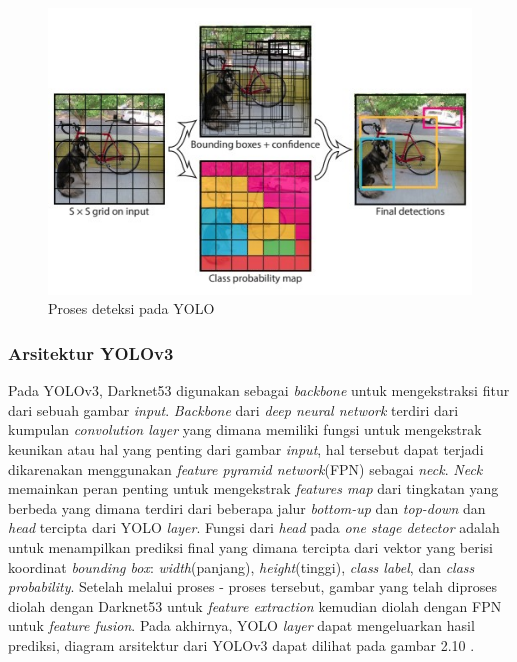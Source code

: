 \begin{figure}[ht]
  \centering
  \includegraphics[scale=0.7]{gambar/proses-deteksi-yolo.jpg}
  \caption{Proses deteksi pada YOLO}
  \label{fig:deteksiyolo}
\end{figure}

\subsubsection{Arsitektur YOLOv3}
\label{subsec:arsitektur-yolov3}
Pada YOLOv3, Darknet53 digunakan sebagai \emph{backbone} untuk mengekstraksi fitur dari sebuah gambar \emph{input}. \emph{Backbone} dari \emph{deep neural network} terdiri dari
kumpulan \emph{convolution layer} yang dimana memiliki fungsi untuk mengekstrak keunikan atau hal yang penting dari gambar \emph{input}, hal tersebut dapat terjadi dikarenakan
menggunakan \emph{feature pyramid network}(FPN) sebagai \emph{neck}. \emph{Neck} memainkan peran penting untuk mengekstrak \emph{features map} dari tingkatan yang berbeda yang dimana
terdiri dari beberapa jalur \emph{bottom-up} dan \emph{top-down} dan \emph{head} tercipta dari YOLO \emph{layer}. Fungsi dari \emph{head} pada \emph{one stage detector} adalah untuk menampilkan
prediksi final yang dimana tercipta dari vektor yang berisi koordinat \emph{bounding box}: \emph{width}(panjang), \emph{height}(tinggi), \emph{class label}, dan \emph{class probability}. Setelah melalui proses - proses tersebut,
gambar yang telah diproses diolah dengan Darknet53 untuk \emph{feature extraction} kemudian diolah dengan FPN untuk \emph{feature fusion}. Pada akhirnya, YOLO \emph{layer} dapat mengeluarkan
hasil prediksi, diagram arsitektur dari YOLOv3 dapat dilihat pada gambar 2.10 \citep{uav-yolo}.

